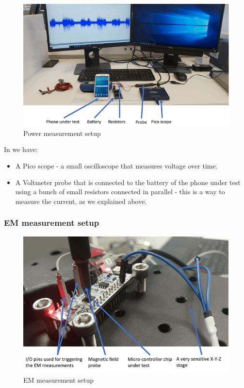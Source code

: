 \begin{figure}[!ht]
    \centering
    \includegraphics[width=1.0\linewidth]{images/chapter4/power_measurement_setup.png}
    \caption{Power measurement setup} \label{fig:power_measurement_setup}
\end{figure}

In  we have:
\begin{itemize}
    \item A Pico scope - a small oscilloscope that measures voltage over time.
    \item A Voltmeter probe that is connected to the battery of the phone under test using a bunch of small resistors connected in parallel - this is a way to measure the current, as we explained above.
\end{itemize}

\subsubsection{EM measurement setup}
\begin{figure}[!ht]
    \centering
    \includegraphics[width=1.0\linewidth]{images/chapter4/em_measurement_setup.png}
    \caption{EM measurement setup} \label{fig:em_measurement_setup}
\end{figure}

